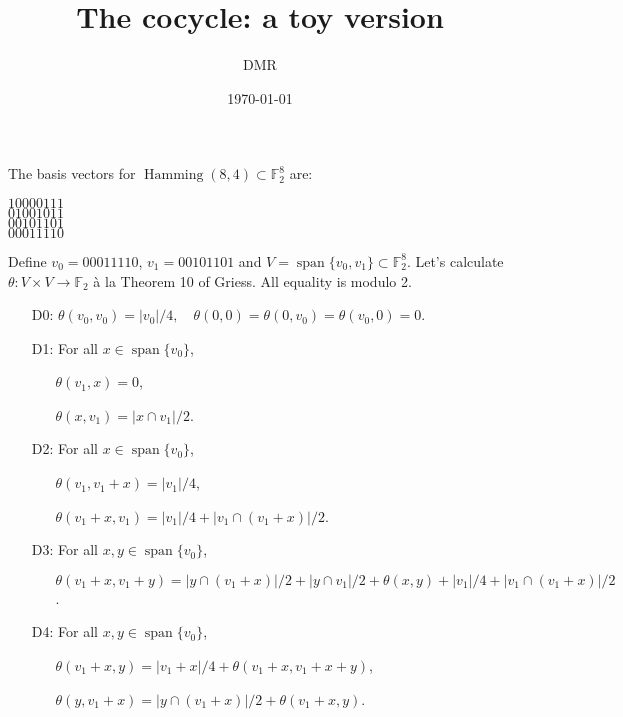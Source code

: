 \documentclass[a4paper,debug]{tufte-handout}
\title{The cocycle: a toy version}
\date{\today}
\author{DMR}
\DeclareMathOperator{\Hamming}{Hamming}
\DeclareMathOperator{\Span}{span}
\newcommand{\F}{\mathbb{F}}
\begin{document}
\maketitle

\noindent 
The basis vectors for $\Hamming(8,4)\subset \F_2^8$ are:\\
\begin{center}
$10000111$\\
$01001011$\\
$00101101$\\
$00011110$
\end{center}
Define $v_0 = 00011110$, $v_1=00101101$ and $V = \Span\{v_0,v_1\}\subset \F_2^8$.
Let's calculate $\theta\colon V\times V \to \F_2$
\`a la Theorem 10 of Griess\cite{Griess}. All equality is modulo 2.

\begin{itemize}

	\item[D0:] $\theta(v_0,v_0) = |v_0|/4,\quad \theta(0,0) = \theta(0,v_0) = \theta(v_0,0) = 0$.

	\item[D1:] For all $x \in \Span\{v_0\}$, 
	\begin{itemize}
		\item[] $\theta(v_1,x) = 0$, 
		\item[] $\theta(x,v_1) = |x\cap v_1|/2$.
	\end{itemize}

	\item[D2:] For all $x \in \Span\{v_0\}$,
	\begin{itemize}
	 	\item[] $\theta(v_1,v_1+x) = |v_1|/4$,
	 	\item[] $\theta(v_1 + x,v_1) = |v_1|/4 + |v_1\cap(v_1+x)|/2$.
	 \end{itemize} 
	 \item[D3:] For all $x,y\in \Span\{v_0\}$,
	 \begin{itemize}
	 	\item[] $\theta(v_1+x,v_1+y) = |y\cap(v_1+x)|/2 + |y\cap v_1|/2 + \theta(x,y) + |v_1|/4 + |v_1\cap(v_1+x)|/2$.
	 \end{itemize}
	 \item[D4:] For all $x,y\in \Span\{v_0\}$,
	 \begin{itemize}
	 	\item[] $\theta(v_1+x,y) = |v_1+x|/4 + \theta(v_1+x,v_1+x+y)$,
	 	\item[] $\theta(y,v_1+x) = |y\cap(v_1+x)|/2 + \theta(v_1+x,y)$.
	 \end{itemize}

\end{itemize}
\end{document}
